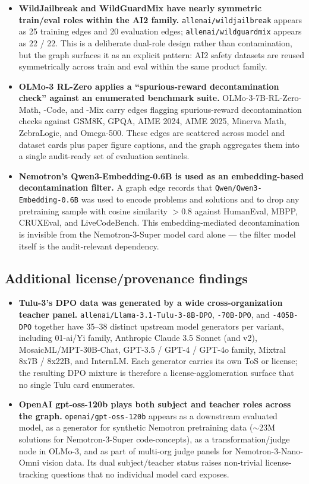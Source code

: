 \begin{itemize}
    \item \textbf{WildJailbreak and WildGuardMix have nearly symmetric train/eval roles within the AI2 family.}
    \texttt{allenai/wildjailbreak} appears as 25 training edges and 20 evaluation edges; \texttt{allenai/wildguardmix} appears as 22 / 22. This is a deliberate dual-role design rather than contamination, but the graph surfaces it as an explicit pattern: AI2 safety datasets are reused symmetrically across train and eval within the same product family.

    \item \textbf{OLMo-3 RL-Zero applies a ``spurious-reward decontamination check'' against an enumerated benchmark suite.}
    OLMo-3-7B-RL-Zero-Math, -Code, and -Mix carry edges flagging spurious-reward decontamination checks against GSM8K, GPQA, AIME 2024, AIME 2025, Minerva Math, ZebraLogic, and Omega-500. These edges are scattered across model and dataset cards plus paper figure captions, and the graph aggregates them into a single audit-ready set of evaluation sentinels.

    \item \textbf{Nemotron's Qwen3-Embedding-0.6B is used as an embedding-based decontamination filter.}
    A graph edge records that \texttt{Qwen/Qwen3-Embedding-0.6B} was used to encode problems and solutions and to drop any pretraining sample with cosine similarity $> 0.8$ against HumanEval, MBPP, CRUXEval, and LiveCodeBench. This embedding-mediated decontamination is invisible from the Nemotron-3-Super model card alone --- the filter model itself is the audit-relevant dependency.
\end{itemize}

\subsection{Additional license/provenance findings}

\begin{itemize}
    \item \textbf{Tulu-3's DPO data was generated by a wide cross-organization teacher panel.}
    \texttt{allenai/Llama-3.1-Tulu-3-8B-DPO}, \texttt{-70B-DPO}, and \texttt{-405B-DPO} together have 35--38 distinct upstream model generators per variant, including 01-ai/Yi family, Anthropic Claude 3.5 Sonnet (and v2), MosaicML/MPT-30B-Chat, GPT-3.5 / GPT-4 / GPT-4o family, Mixtral 8x7B / 8x22B, and InternLM. Each generator carries its own ToS or license; the resulting DPO mixture is therefore a license-agglomeration surface that no single Tulu card enumerates.

    \item \textbf{OpenAI gpt-oss-120b plays both subject and teacher roles across the graph.}
    \texttt{openai/gpt-oss-120b} appears as a downstream evaluated model, as a generator for synthetic Nemotron pretraining data ($\sim$23M solutions for Nemotron-3-Super code-concepts), as a transformation/judge node in OLMo-3, and as part of multi-org judge panels for Nemotron-3-Nano-Omni vision data. Its dual subject/teacher status raises non-trivial license-tracking questions that no individual model card exposes.
\end{itemize}

